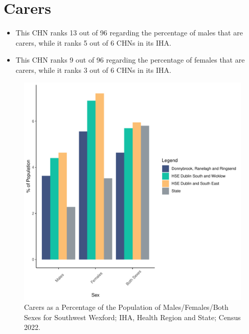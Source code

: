 \documentclass{article}
\begin{document}
\section{Carers}\label{sect:Carers}
\begin{itemize}
\item This CHN ranks  13 out of 96 regarding the percentage of males that are carers, while it ranks   5 out of 6 CHNs in its IHA.
\item This CHN ranks  9 out of 96 regarding the percentage of females that are carers, while it ranks   3 out of 6 CHNs in its IHA.
\end{itemize}
\begin{figure}[H]
	\centering
	\includegraphics[width = 150mm]{../figures/CareED.pdf}
	\caption{Carers as a Percentage of the Population of Males/Females/Both Sexes for Southwest Wexford; IHA, Health Region and State; Census 2022.}
	\label{fig:2ae19629-1a6a-13a3-e055-000000000001}
	\end{figure}
\end{document}
